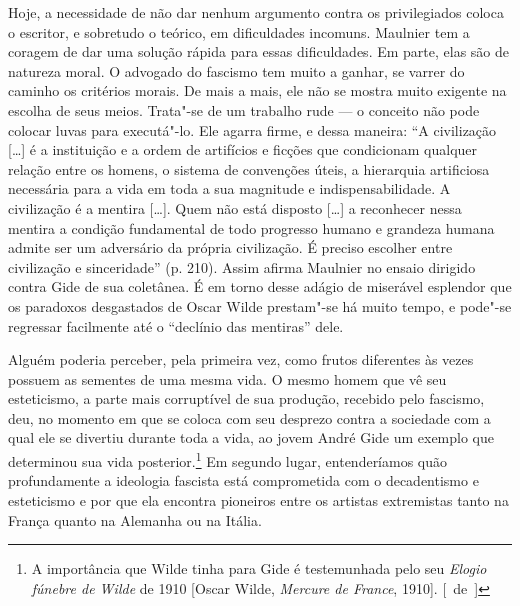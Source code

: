 Hoje, a necessidade de não dar nenhum argumento contra os
privilegiados coloca o escritor, e sobretudo o teórico, em dificuldades
incomuns. Maulnier tem a coragem de dar uma solução rápida para essas
dificuldades. Em parte, elas são de natureza moral. O advogado do
fascismo tem muito a ganhar, se varrer do caminho os critérios morais.
De mais a mais, ele não se mostra muito exigente na escolha de seus
meios. Trata"-se de um trabalho rude --- o conceito não pode colocar luvas
para executá"-lo. Ele agarra firme, e dessa maneira: ``A civilização
{[}\ldots{}{]} é a instituição e a ordem de artifícios e ficções que
condicionam qualquer relação entre os homens, o sistema de convenções
úteis, a hierarquia artificiosa necessária para a vida em toda a sua
magnitude e indispensabilidade. A civilização é a mentira {[}\ldots{}{]}. Quem
não está disposto {[}\ldots{}{]} a reconhecer nessa mentira a condição
fundamental de todo progresso humano e grandeza humana admite ser um
adversário da própria civilização. É preciso escolher entre civilização
e sinceridade'' (p. 210). Assim afirma Maulnier no ensaio dirigido
contra Gide de sua coletânea. É em torno desse adágio de miserável
esplendor que os paradoxos desgastados de Oscar Wilde prestam"-se há
muito tempo, e pode"-se regressar facilmente até o ``declínio das
mentiras'' dele.

Alguém poderia perceber, pela primeira vez, como frutos diferentes às
vezes possuem as sementes de uma mesma vida. O mesmo homem que vê seu
esteticismo, a parte mais corruptível de sua produção, recebido pelo
fascismo, deu, no momento em que se coloca com seu desprezo contra a
sociedade com a qual ele se divertiu durante toda a vida, ao jovem
André Gide um exemplo que determinou sua vida posterior.\footnote{A
  importância que Wilde tinha para Gide é testemunhada pelo seu
  \emph{Elogio fúnebre de Wilde} de 1910 {[}Oscar Wilde, \emph{Mercure
  de France}, 1910{]}. [~de~]} Em segundo lugar, entenderíamos quão
profundamente a ideologia fascista está comprometida com o decadentismo
e esteticismo e por que ela encontra pioneiros entre os artistas
extremistas tanto na França quanto na Alemanha ou na Itália.

